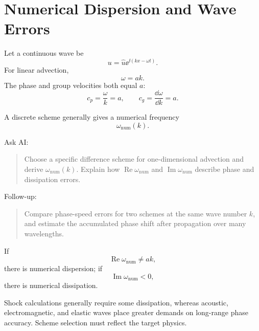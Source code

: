 \section{Numerical Dispersion and Wave Errors}
Let a continuous wave be
\[
u=\widehat u\ee^{\ii(kx-\omega t)}.
\]
For linear advection,
\[
\omega=ak.
\]
The phase and group velocities both equal \(a\):
\[
c_p=\frac{\omega}{k}=a,
\qquad
c_g=\frac{\dd\omega}{\dd k}=a.
\]

A discrete scheme generally gives a numerical frequency
\[
\omega_{\mathrm{num}}(k).
\]

\begin{askai}
Ask AI:
\begin{quote}
Choose a specific difference scheme for one-dimensional advection and derive \(\omega_{\mathrm{num}}(k)\). Explain how \(\operatorname{Re}\omega_{\mathrm{num}}\) and \(\operatorname{Im}\omega_{\mathrm{num}}\) describe phase and dissipation errors.
\end{quote}

Follow-up:
\begin{quote}
Compare phase-speed errors for two schemes at the same wave number \(k\), and estimate the accumulated phase shift after propagation over many wavelengths.
\end{quote}
\end{askai}

If
\[
\operatorname{Re}\omega_{\mathrm{num}}\neq ak,
\]
there is numerical dispersion; if
\[
\operatorname{Im}\omega_{\mathrm{num}}<0,
\]
there is numerical dissipation.

Shock calculations generally require some dissipation, whereas acoustic, electromagnetic, and elastic waves place greater demands on long-range phase accuracy. Scheme selection must reflect the target physics.
